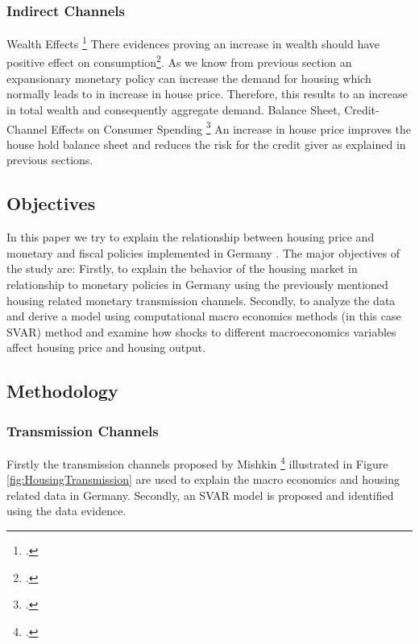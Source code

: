 \subsubsection{Indirect Channels}
Wealth Effects \footcite[See.][]{Mishkin2007}
There evidences proving an increase in wealth should have positive effect on consumption\footcite[See.][]{Mishkin2007}. As we know from previous section an expansionary monetary policy can increase the demand for housing which normally leads to in increase in house price. Therefore, this results to an increase in total wealth and consequently aggregate demand.
Balance Sheet, Credit-Channel Effects on Consumer Spending \footcite[See.][]{Mishkin2007}
An increase in house price improves the house hold balance sheet and reduces the risk for the credit giver as explained in previous sections.



\subsection{Objectives}
In this paper we try to explain the relationship between housing price and monetary and fiscal policies implemented in Germany .
The major objectives of the study are: Firstly, to explain the behavior of the housing market in relationship to monetary policies in Germany using the previously mentioned housing related monetary transmission channels. Secondly, to analyze the data and derive a model using computational macro economics methods (in this case SVAR) method and examine how shocks to different macroeconomics variables affect housing price and housing output.

\subsection{Methodology}
 \subsubsection{Transmission Channels}
Firstly the transmission channels proposed by Mishkin \footcite[See.][]{Mishkin2007} illustrated in Figure \ref{fig:HousingTransmission} are used to explain the macro economics and housing related data in Germany. Secondly, an SVAR model is proposed and identified using the data evidence. 
